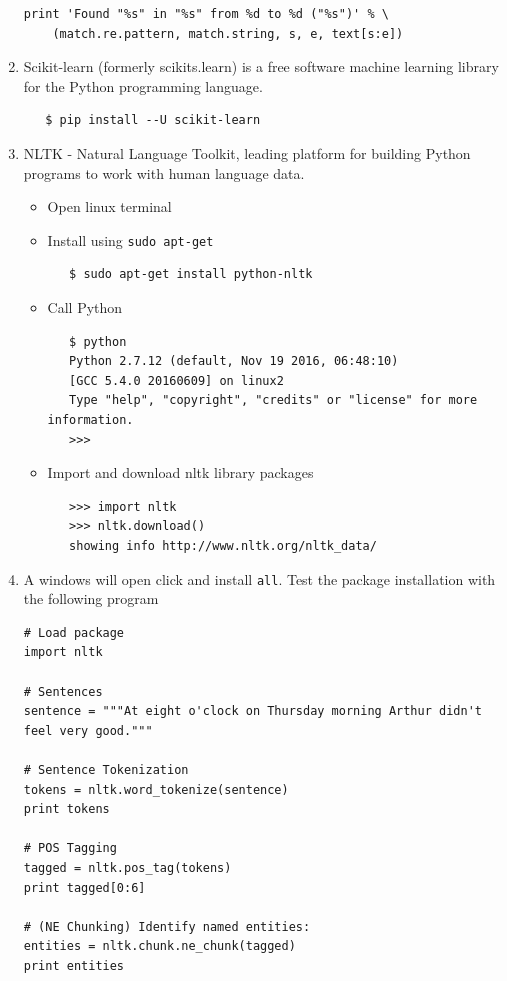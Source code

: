 \documentclass{article}
\begin{document}
\begin{enumerate}
\begin{verbatim}
print 'Found "%s" in "%s" from %d to %d ("%s")' % \
    (match.re.pattern, match.string, s, e, text[s:e])
\end{verbatim}
\normalsize
\item Scikit-learn (formerly scikits.learn) is a free software machine learning library for the Python programming language.
\scriptsize 
  \begin{verbatim}
   $ pip install --U scikit-learn
  \end{verbatim}
  \normalsize
\item NLTK - Natural Language Toolkit, leading platform for building Python programs to work with human language data.
  \begin{itemize}
   \item Open linux terminal
   \item Install using \verb+sudo apt-get+
   \scriptsize 
  \begin{verbatim}
   $ sudo apt-get install python-nltk
  \end{verbatim}
  \normalsize
   \item Call Python
   \scriptsize 
   \begin{verbatim}
   $ python
   Python 2.7.12 (default, Nov 19 2016, 06:48:10) 
   [GCC 5.4.0 20160609] on linux2
   Type "help", "copyright", "credits" or "license" for more information.
   >>>
   \end{verbatim}
   \normalsize
   \item Import and download  nltk library packages
   \scriptsize 
   \begin{verbatim}
   >>> import nltk
   >>> nltk.download()
   showing info http://www.nltk.org/nltk_data/
   \end{verbatim}
   \normalsize
   \end{itemize}
   \item A windows will open click and install \verb+all+. Test the package installation with the following program
\scriptsize    
\begin{verbatim}
# Load package
import nltk

# Sentences
sentence = """At eight o'clock on Thursday morning Arthur didn't feel very good."""

# Sentence Tokenization
tokens = nltk.word_tokenize(sentence)
print tokens

# POS Tagging
tagged = nltk.pos_tag(tokens)
print tagged[0:6]

# (NE Chunking) Identify named entities:
entities = nltk.chunk.ne_chunk(tagged)
print entities


\end{verbatim}
\end{enumerate}
\end{document}
